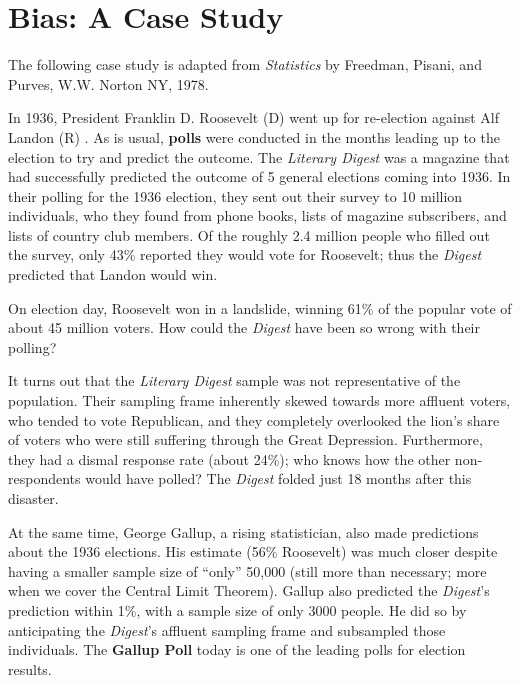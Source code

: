 \documentclass[
  letterpaper,
  DIV=11,
  numbers=noendperiod]{scrreprt}
\begin{document}
\hypertarget{bias-a-case-study}{%
\section{Bias: A Case Study}\label{bias-a-case-study}}

The following case study is adapted from \emph{Statistics} by Freedman,
Pisani, and Purves, W.W. Norton NY, 1978.

In 1936, President Franklin D. Roosevelt (D) went up for re-election
against Alf Landon (R) . As is usual, \textbf{polls} were conducted in
the months leading up to the election to try and predict the outcome.
The \emph{Literary Digest} was a magazine that had successfully
predicted the outcome of 5 general elections coming into 1936. In their
polling for the 1936 election, they sent out their survey to 10 million
individuals, who they found from phone books, lists of magazine
subscribers, and lists of country club members. Of the roughly 2.4
million people who filled out the survey, only 43\% reported they would
vote for Roosevelt; thus the \emph{Digest} predicted that Landon would
win.

On election day, Roosevelt won in a landslide, winning 61\% of the
popular vote of about 45 million voters. How could the \emph{Digest}
have been so wrong with their polling?

It turns out that the \emph{Literary Digest} sample was not
representative of the population. Their sampling frame inherently skewed
towards more affluent voters, who tended to vote Republican, and they
completely overlooked the lion's share of voters who were still
suffering through the Great Depression. Furthermore, they had a dismal
response rate (about 24\%); who knows how the other non-respondents
would have polled? The \emph{Digest} folded just 18 months after this
disaster.

At the same time, George Gallup, a rising statistician, also made
predictions about the 1936 elections. His estimate (56\% Roosevelt) was
much closer despite having a smaller sample size of ``only'' 50,000
(still more than necessary; more when we cover the Central Limit
Theorem). Gallup also predicted the \emph{Digest}'s prediction within
1\%, with a sample size of only 3000 people. He did so by anticipating
the \emph{Digest}'s affluent sampling frame and subsampled those
individuals. The \textbf{Gallup Poll} today is one of the leading polls
for election results.
\end{document}
